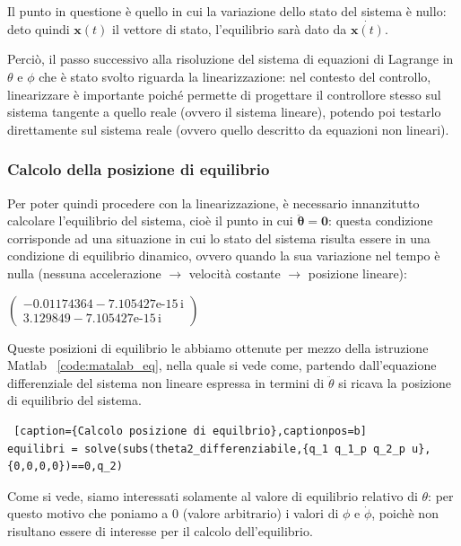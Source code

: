 Il punto in questione è quello in cui la variazione dello stato del sistema è nullo: deto quindi $\mathbf{x}(t)$ il vettore di stato, l'equilibrio sarà dato da $\dot{\mathbf{x}(t)}$.

Perciò, il passo successivo alla risoluzione del sistema di equazioni di Lagrange in $\theta$ e $\phi$ che è stato svolto riguarda la linearizzazione: nel contesto del controllo, linearizzare è importante poiché permette di progettare il controllore stesso sul sistema tangente a quello reale (ovvero il sistema lineare), potendo poi testarlo direttamente sul sistema reale (ovvero quello descritto da equazioni non lineari).

\subsubsection{Calcolo della posizione di equilibrio}
Per poter quindi procedere con la linearizzazione, è necessario innanzitutto calcolare l'equilibrio del sistema, cioè il punto in cui $\mathbf{\ddot{\theta} = 0}$: questa condizione corrisponde  ad una situazione in cui lo stato del sistema risulta essere in una condizione di equilibrio dinamico, ovvero quando la sua variazione nel tempo è nulla (nessuna accelerazione $\rightarrow$ velocità costante $\rightarrow$ posizione lineare):
\begin{center}
	$\left(\begin{array}{c}
		-0.01174364-\text{7.105427e-15}\,\mathrm{i}\\
		3.129849-\text{7.105427e-15}\,\mathrm{i}
	\end{array}\right)$
\end{center}

Queste posizioni di equilibrio le abbiamo ottenute per mezzo della istruzione Matlab ~\ref{code:matalab_eq}, nella quale si vede come, partendo dall'equazione differenziale del sistema non lineare espressa in termini di $\ddot{\theta}$ si ricava la posizione di equilibrio del sistema.
\begin{lstlisting} [caption={Calcolo posizione di equilbrio},captionpos=b]
equilibri = solve(subs(theta2_differenziabile,{q_1 q_1_p q_2_p u},{0,0,0,0})==0,q_2)
\end{lstlisting}

Come si vede, siamo interessati solamente al valore di equilibrio relativo di $\theta$: per questo motivo che poniamo a 0 (valore arbitrario) i valori di $\phi$ e $\dot{\phi}$, poichè non risultano essere di interesse per il calcolo dell'equilibrio.

